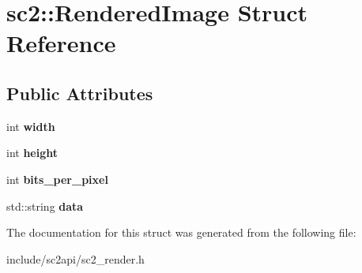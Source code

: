 \hypertarget{structsc2_1_1_rendered_image}{}\section{sc2\+:\+:Rendered\+Image Struct Reference}
\label{structsc2_1_1_rendered_image}
\subsection*{Public Attributes}
\begin{DoxyCompactItemize}
\item 
\mbox{\label{structsc2_1_1_rendered_image_a795baf471fbda8e6e2056a15fe1e79bd}} 
int {\bfseries width}
\item 
\mbox{\label{structsc2_1_1_rendered_image_a7c17911b6b9a3a75bfc4f7370da74807}} 
int {\bfseries height}
\item 
\mbox{\label{structsc2_1_1_rendered_image_acc89f6b61f175ea4008ba57b47d490f2}} 
int {\bfseries bits\+\_\+per\+\_\+pixel}
\item 
\mbox{\label{structsc2_1_1_rendered_image_ad1cd067ea6a2ffc0c34930d812720a8a}} 
std\+::string {\bfseries data}
\end{DoxyCompactItemize}


The documentation for this struct was generated from the following file\+:\begin{DoxyCompactItemize}
\item 
include/sc2api/sc2\+\_\+render.\+h\end{DoxyCompactItemize}
